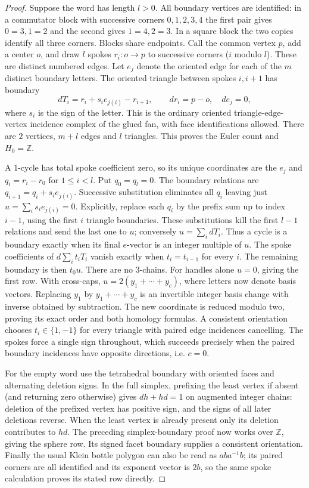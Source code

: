 \begin{proof}
Suppose the word has length $l>0$. All boundary vertices are identified:
in a commutator block with successive corners $0,1,2,3,4$ the first
pair gives $0=3,1=2$ and the second gives $1=4,2=3$. In a square
block the two copies identify all three corners. Blocks share endpoints.
Call the common vertex $p$, add a center $o$, and draw $l$ spokes
$r_i:o\to p$ to successive corners ($i$ modulo $l$). These are
distinct numbered edges. Let $e_j$ denote the oriented edge for each of
the $m$ distinct boundary letters. The oriented triangle between spokes
$i,i+1$ has boundary
\[
 dT_i=r_i+s_ie_{j(i)}-r_{i+1},\qquad
 dr_i=p-o,\quad de_j=0 ,
\]
where $s_i$ is the sign of the letter. This is the ordinary oriented
triangle-edge-vertex incidence complex of the glued fan, with face
identifications allowed. There are $2$ vertices, $m+l$ edges and $l$
triangles. This proves the Euler count and $H_0=\mathbb Z$.

A $1$-cycle has total spoke coefficient zero, so its unique coordinates
are the $e_j$ and $q_i=r_i-r_0$ for $1\le i<l$. Put $q_0=q_l=0$.
The boundary relations are $q_{i+1}=q_i+s_ie_{j(i)}$. Successive
substitution eliminates all $q_i$ leaving just
$u=\sum_i s_i e_{j(i)}=0$. Explicitly, replace each $q_i$ by the prefix
sum up to index $i-1$, using the first $i$ triangle boundaries.
These substitutions kill the first $l-1$ relations and send the last
one to $u$; conversely $u=\sum_i dT_i$. Thus a cycle is a boundary
exactly when its final $e$-vector is an integer multiple of $u$.
The spoke coefficients of $d\sum_i t_iT_i$ vanish exactly when
$t_i=t_{i-1}$ for every $i$. The remaining boundary is then $t_0u$.
There are no $3$-chains. For handles alone $u=0$, giving the first
row. With cross-caps, $u=2(y_1+\cdots+y_c)$, where letters now denote
basis vectors. Replacing $y_1$ by $y_1+\cdots+y_c$ is an invertible
integer basis change with inverse obtained by subtraction. The new
coordinate is reduced modulo two, proving its exact order and both
homology formulas. A consistent orientation chooses $t_i\in\{1,-1\}$
for every triangle with paired edge incidences cancelling. The spokes
force a single sign throughout, which succeeds precisely when the
paired boundary incidences have opposite directions, i.e. $c=0$.

For the empty word use the tetrahedral boundary with oriented faces
and alternating deletion signs. In the full simplex, prefixing the
least vertex if absent (and returning zero otherwise) gives
$dh+hd=1$ on augmented integer chains: deletion of the prefixed vertex
has positive sign, and the signs of all later deletions reverse. When
the least vertex is already present only its deletion contributes to
$hd$. The preceding simplex-boundary proof now works over $\mathbb Z$,
giving the sphere row. Its signed facet boundary supplies a consistent
orientation. Finally the usual Klein bottle polygon can also be read as
$a b a^{-1} b$; its paired corners are all identified and its exponent
vector is $2b$, so the same spoke calculation proves its stated row
directly.
\end{proof}

